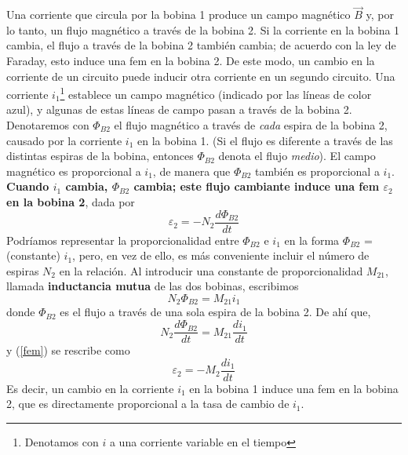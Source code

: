 Una corriente que circula por la bobina 1 produce un campo magnético $\vec{B}$ y, por lo tanto, un flujo magnético a través de la bobina 2. Si la corriente en la bobina 1 cambia, el flujo a través de la bobina 2 también cambia; de acuerdo con la ley de Faraday, esto induce una fem en la bobina 2. De este modo, un cambio en la corriente de un circuito puede inducir otra corriente en un segundo circuito.
Una corriente $i_1$\footnote{Denotamos con $i$ a una corriente variable en el tiempo } establece un campo magnético (indicado por las líneas de color azul), y algunas de estas líneas de campo pasan a través de la bobina 2. Denotaremos con $\Phi_{B2}$ el flujo magnético a través de \textit{cada} espira de la bobina 2, causado por la corriente $i_1$ en la bobina 1. (Si el flujo es diferente a través de las distintas espiras de la bobina, entonces $\Phi_{B2}$ denota el flujo  \textit{medio}). El campo magnético es proporcional a $i_1$, de manera que $\Phi_{B2}$ también es proporcional a $i_1$. \textbf{Cuando $i_1$ cambia, $\Phi_{B2}$ cambia; este flujo cambiante induce una fem $\varepsilon_2$ en la bobina 2}, dada por
\begin{equation}\label{fem}
\varepsilon_2=-N_2\frac{d\Phi_{B2}}{dt}
\end{equation}
Podríamos representar la proporcionalidad entre $\Phi_{B2}$ e $i_1$ en la forma $\Phi_{B2}$ = (constante) $i_1$, pero, en vez de ello, es más conveniente incluir el número de espiras $N_2$ en la relación. Al introducir una constante de proporcionalidad $M_{21}$, llamada \textbf{inductancia mutua} de las dos bobinas, escribimos
\begin{equation}\label{30.2}
N_2\Phi_{B2}=M_{21}i_1
\end{equation}
donde $\Phi_{B2}$ es el flujo a través de una sola espira de la bobina 2. De ahí que,
\begin{equation}
N_2\frac{d\Phi_{B2}}{dt}=M_{21}\frac{di_1}{dt}
\end{equation}
y (\ref{fem}) se rescribe como
\begin{equation}
\varepsilon_2=-M_2\frac{di_1}{dt}
\end{equation}
Es decir, un cambio en la corriente $i_1$ en la bobina 1 induce una fem en la bobina 2, que es directamente proporcional a la tasa de cambio de $i_1$.


